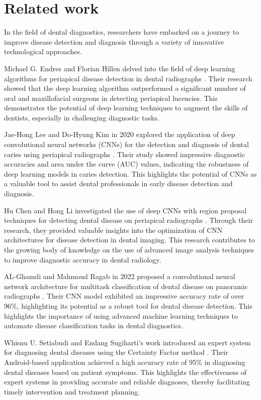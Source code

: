 \section{Related work}

In the field of dental diagnostics, researchers have embarked on a journey to improve disease detection and diagnosis through a variety of innovative technological approaches.

Michael G. Endres and Florian Hillen delved into the field of deep learning algorithms for periapical disease detection in dental radiographs \cite{endres2020development}. Their research showed that the deep learning algorithm outperformed a significant number of oral and maxillofacial surgeons in detecting periapical lucencies. This demonstrates the potential of deep learning techniques to augment the skills of dentists, especially in challenging diagnostic tasks.

Jae-Hong Lee and Do-Hyung Kim in 2020 explored the application of deep convolutional neural networks (CNNs) for the detection and diagnosis of dental caries using periapical radiographs \cite{lee2018detection}. Their study showed impressive diagnostic accuracies and area under the curve (AUC) values, indicating the robustness of deep learning models in caries detection. This highlights the potential of CNNs as a valuable tool to assist dental professionals in early disease detection and diagnosis.

Hu Chen and Hong Li investigated the use of deep CNNs with region proposal techniques for detecting dental disease on periapical radiographs \cite{chen2021dental}. Through their research, they provided valuable insights into the optimization of CNN architectures for disease detection in dental imaging. This research contributes to the growing body of knowledge on the use of advanced image analysis techniques to improve diagnostic accuracy in dental radiology.

AL-Ghamdi and Mahmoud Ragab in 2022 proposed a convolutional neural network architecture for multitask classification of dental disease on panoramic radiographs \cite{al2022detection}. Their CNN model exhibited an impressive accuracy rate of over 96\%, highlighting its potential as a robust tool for dental disease detection. This highlights the importance of using advanced machine learning techniques to automate disease classification tasks in dental diagnostics.

Whisnu U. Setiabudi and Endang Sugiharti's work introduced an expert system for diagnosing dental diseases using the Certainty Factor method \cite{setiabudi2017expert}. Their Android-based application achieved a high accuracy rate of 95\% in diagnosing dental diseases based on patient symptoms. This highlights the effectiveness of expert systems in providing accurate and reliable diagnoses, thereby facilitating timely intervention and treatment planning.

